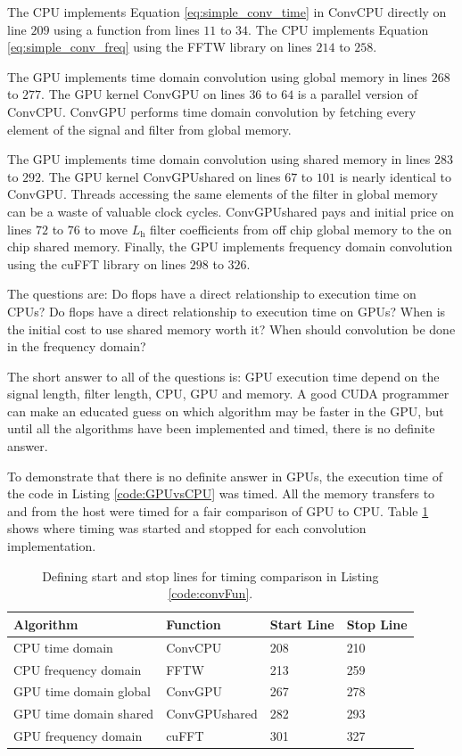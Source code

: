 The CPU implements Equation \eqref{eq:simple_conv_time} in ConvCPU directly on line $209$ using a function from lines $11$ to $34$.
The CPU implements Equation \eqref{eq:simple_conv_freq} using the FFTW library on lines $214$ to $258$.

The GPU implements time domain convolution using global memory in lines $268$ to $277$.
The GPU kernel ConvGPU on lines $36$ to $64$ is a parallel version of ConvCPU.
ConvGPU performs time domain convolution by fetching every element of the signal and filter from global memory.

The GPU implements time domain convolution using shared memory in lines $283$ to $292$.
The GPU kernel ConvGPUshared on lines $67$ to $101$ is nearly identical to ConvGPU.
Threads accessing the same elements of the filter in global memory can be a waste of valuable clock cycles.
ConvGPUshared pays and initial price on lines $72$ to $76$ to move $L_\text{h}$ filter coefficients from off chip global memory to the on chip shared memory.
Finally, the GPU implements frequency domain convolution using the cuFFT library on lines $298$ to $326$.

The questions are:
Do flops have a direct relationship to execution time on CPUs? 
Do flops have a direct relationship to execution time on GPUs? 
When is the initial cost to use shared memory worth it?
When should convolution be done in the frequency domain?

The short answer to all of the questions is: GPU execution time depend on the signal length, filter length, CPU, GPU and memory.
A good CUDA programmer can make an educated guess on which algorithm may be faster in the GPU, but until all the algorithms have been implemented and timed, there is no definite answer.

To demonstrate that there is no definite answer in GPUs, 
the execution time of the code in Listing \ref{code:GPUvsCPU} was timed.
All the memory transfers to and from the host were timed for a fair comparison of GPU to CPU.
Table \ref{tab:CPUvsGPUtimingTable} shows where timing was started and stopped for each convolution implementation.
\begin{table}
\caption{Defining start and stop lines for timing comparison in Listing \ref{code:convFun}.}
\begin{center}
\begin{tabular}{llll}
	\toprule
	Algorithm 				& Function		& Start Line	& Stop  Line		\\ \midrule
	CPU time domain 		& ConvCPU 		& 208			& 210 				\\
	CPU frequency domain 	& FFTW 			& 213			& 259 				\\
	GPU time domain global 	& ConvGPU 		& 267			& 278				\\
	GPU time domain shared 	& ConvGPUshared & 282			& 293				\\
	GPU frequency domain 	& cuFFT			& 301			& 327				\\ 
	\bottomrule
\end{tabular}
\end{center}
\label{tab:CPUvsGPUtimingTable}
\end{table}

